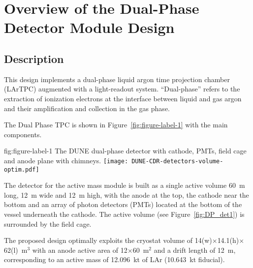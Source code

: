\chapter{Overview of the Dual-Phase Detector Module Design}
\label{ch:fddp-ov}



\section{Description}
\label{sec:fddp-ov-description}
This design implements a dual-phase liquid argon
time projection chamber (LArTPC) augmented with a light-readout
system. ``Dual-phase'' refers to the extraction of ionization
electrons at the interface between liquid and gas argon and their
amplification and collection in the gas phase.

The Dual Phase TPC is shown in Figure~\ref{fig:figure-label-1} with the main components.

\begin{dunefigure}{fig:figure-label-1}
{The DUNE dual-phase 
detector with cathode, PMTs, field cage and anode plane with chimneys.}
\texttt{[image: DUNE-CDR-detectors-volume-optim.pdf]}
\end{dunefigure}
The detector for the  active mass module is built as a single
active volume 60~m long, 12~m wide and 12~m high, with the anode at the
top, the cathode near the bottom and an array of photon detectors (PMTs)
located at the bottom of the vessel underneath the cathode. 
The active volume (see Figure~\ref{fig:DP_det1}) is surrounded by the
field cage.

The proposed design optimally exploits the
cryostat volume of 14(w)$\times$14.1(h)$\times$62(l)~m$^3$ with an
anode active area of 12$\times$60~m$^2$ and a drift length of 12~m,
corresponding to an active mass of 12.096~kt of LAr (10.643~kt
fiducial).

